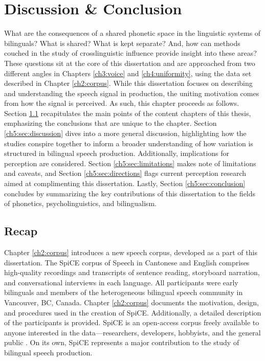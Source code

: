 
\chapter{Discussion \& Conclusion}
\label{ch:Discussion}

What are the consequences of a shared phonetic space in the linguistic systems of bilinguals? What is shared? What is kept separate? And, how can methods couched in the study of crosslinguistic influence provide insight into these areas? These questions sit at the core of this dissertation and are approached from two different angles in Chapters \ref{ch3:voice} and \ref{ch4:uniformity}, using the data set described in Chapter \ref{ch2:corpus}. While this dissertation focuses on describing and understanding the speech signal in production, the uniting motivation comes from how the signal is perceived. As such, this chapter proceeds as follows. Section \ref{ch5:sec:recap} recapitulates the main points of the content chapters of this thesis, emphasizing the conclusions that are unique to the chapter. Section \ref{ch5:sec:discussion} dives into a more general discussion, highlighting how the studies conspire together to inform a broader understanding of how variation is structured in bilingual speech production. Additionally, implications for perception are considered. Section \ref{ch5:sec:limitations} makes note of limitations and caveats, and Section \ref{ch5:sec:directions} flags current perception research aimed at complimenting this dissertation. Lastly, Section \ref{ch5:sec:conclusion} concludes by summarizing the key contributions of this dissertation to the fields of phonetics, psycholinguistics, and bilingualism.

\section{Recap}\label{ch5:sec:recap}

Chapter \ref{ch2:corpus} introduces a new speech corpus, developed as a part of this dissertation. The SpiCE corpus of Speech in Cantonese and English comprises high-quality recordings and transcripts of sentence reading, storyboard narration, and conversational interviews in each language. All participants were early bilinguals and members of the heterogeneous bilingual speech community in Vancouver, BC, Canada. Chapter \ref{ch2:corpus} documents the motivation, design, and procedures used in the creation of SpiCE. Additionally, a detailed description of the participants is provided. SpiCE is an open-access corpus freely available to anyone interested in the data---researchers, developers, hobbyists, and the general public \citep{johnson_2021_spice}. On its own, SpiCE represents a major contribution to the study of bilingual speech production. 


